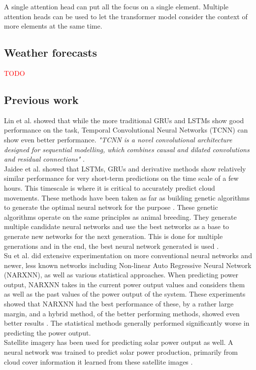 A single attention head can put all the focus on a single element. Multiple attention heads can be used to let the transformer model consider the context of more elements at the same time.\cite{rohrer_transformers_2021} 

\subsection{Weather forecasts}
\textcolor{red}{TODO}

\subsection{Previous work}
Lin et al. \cite{lin_temporal_2020} showed that while the more traditional GRUs and LSTMs show good performance on the task, Temporal Convolutional Neural Networks (TCNN) can show even better performance. \textit{"TCNN is a novel convolutional architecture designed for sequential modelling, which combines causal and dilated convolutions
and residual connections"} \cite{lin_temporal_2020}. \\
Jaidee et al. \cite{jaidee_very_2019} showed that LSTMs, GRUs and derivative methods show relatively similar performance for very short-term predictions on the time scale of a few hours. This timescale is where it is critical to accurately predict cloud movements. 
These methods have been taken as far as building genetic algorithms to generate the optimal neural network for the purpose \cite{jaidee_very_2019}. These genetic algorithms operate on the same principles as animal breeding. They generate multiple candidate neural networks and use the best networks as a base to generate new networks for the next generation. This is done for multiple generations and in the end, the best neural network generated is used \cite{jaidee_very_2019}.\\
Su et al. \cite{su_machine_2019} did extensive experimentation on more conventional neural networks and newer, less known networks including  Non-linear Auto Regressive Neural Network (NARXNN), as well as various statistical approaches. When predicting power output, NARXNN takes in the current power output values and considers them as well as the past values of the power output of the system. These experiments showed that NARXNN had the best performance of these, by a rather large margin, and a hybrid method, of the better performing methods, showed even better results \cite{anderson_using_2018}. The statistical methods generally performed significantly worse in predicting the power output. \\
Satellite imagery has been used for predicting solar power output as well. A neural network was trained to predict solar power production, primarily from cloud cover information it learned from these satellite images \cite{jang_solar_2016}.\\
 
